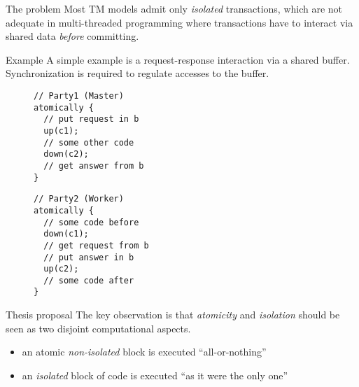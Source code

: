 \documentclass[beamer={noamsthm,10pt},target=bach]{thud}[2014/03/11]
\begin{document}

\begin{frame}{The problem}
Most TM models admit only \emph{isolated} transactions, which are not adequate in multi-threaded programming where transactions have to interact via shared data \emph{before} committing.
\end{frame}

\begin{frame}[fragile]{Example}
A simple example is a request-response interaction via a shared buffer. Synchronization is required to regulate accesses to the buffer.

\begin{figure}
\centering
\begin{minipage}[t]{0.5\textwidth}
\begin{BVerbatim}[baseline=t]
// Party1 (Master)
atomically {
  // put request in b
  up(c1);
  // some other code
  down(c2);
  // get answer from b
}
\end{BVerbatim}
\end{minipage}
\begin{minipage}[t]{0.4\textwidth}
\begin{BVerbatim}[baseline=t]
// Party2 (Worker)
atomically {
  // some code before
  down(c1);
  // get request from b
  // put answer in b
  up(c2);
  // some code after
}
\end{BVerbatim}
\end{minipage}
\end{figure}
\end{frame}

\begin{frame}{Thesis proposal}
The key observation is that \emph{atomicity} and \emph{isolation} should be seen as two disjoint computational aspects.

\begin{itemize}
\item<2->{an atomic \emph{non-isolated} block is executed ``all-or-nothing''}
\item<3->{an \emph{isolated} block of code is executed ``as it were the only one''}
\end{itemize}
\end{frame}
\end{document}
